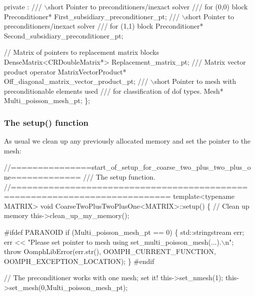 \begin{DoxyCodeInclude}
 private :
  \textcolor{comment}{}
\textcolor{comment}{  /// \(\backslash\)short Pointer to preconditioners/inexact solver}
\textcolor{comment}{  /// for (0,0) block}
\textcolor{comment}{}  Preconditioner* First\_subsidiary\_preconditioner\_pt;
  \textcolor{comment}{}
\textcolor{comment}{  /// \(\backslash\)short Pointer to preconditioners/inexact solver}
\textcolor{comment}{  /// for (1,1) block}
\textcolor{comment}{}  Preconditioner* Second\_subsidiary\_preconditioner\_pt;

  \textcolor{comment}{// Matrix of pointers to replacement matrix blocks}
  DenseMatrix<CRDoubleMatrix*> Replacement\_matrix\_pt;
\textcolor{comment}{}
\textcolor{comment}{  /// Matrix vector product operator}
\textcolor{comment}{}  MatrixVectorProduct* Off\_diagonal\_matrix\_vector\_product\_pt;
\textcolor{comment}{}
\textcolor{comment}{  /// \(\backslash\)short Pointer to mesh with preconditionable elements used}
\textcolor{comment}{  /// for classification of dof types.  }
\textcolor{comment}{}  Mesh* Multi\_poisson\_mesh\_pt;
 \};

\end{DoxyCodeInclude}
\hypertarget{index_coarse_two_plus_two_plus_one_setup}{}\subsubsection{The setup() function}\label{index_coarse_two_plus_two_plus_one_setup}
As usual we clean up any previously allocated memory and set the pointer to the mesh\+:


\begin{DoxyCodeInclude}
 \textcolor{comment}{//===============start\_of\_setup\_for\_coarse\_two\_plus\_two\_plus\_one=============}\textcolor{comment}{}
\textcolor{comment}{ /// The setup function.}
\textcolor{comment}{} \textcolor{comment}{//===========================================================================}
 \textcolor{keyword}{template}<\textcolor{keyword}{typename} MATRIX> 
 \textcolor{keywordtype}{void} CoarseTwoPlusTwoPlusOne<MATRIX>::setup()
 \{
  \textcolor{comment}{// Clean up memory}
  this->clean\_up\_my\_memory();

\textcolor{preprocessor}{#ifdef PARANOID}
  \textcolor{keywordflow}{if} (Multi\_poisson\_mesh\_pt == 0)
   \{
    std::stringstream err;
    err << \textcolor{stringliteral}{"Please set pointer to mesh using set\_multi\_poisson\_mesh(...).\(\backslash\)n"};
    \textcolor{keywordflow}{throw} OomphLibError(err.str(),
                        OOMPH\_CURRENT\_FUNCTION,
                        OOMPH\_EXCEPTION\_LOCATION);
   \}
\textcolor{preprocessor}{#endif }
  
  \textcolor{comment}{// The preconditioner works with one mesh; set it!}
  this->set\_nmesh(1);
  this->set\_mesh(0,Multi\_poisson\_mesh\_pt);

\end{DoxyCodeInclude}



